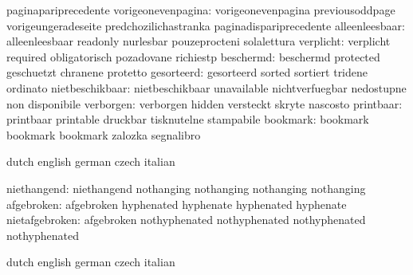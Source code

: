                            paginapariprecedente
       vorigeonevenpagina: vorigeonevenpagina        previousoddpage
                           vorigeungeradeseite       predchozilichastranka
                           paginadispariprecedente
           alleenleesbaar: alleenleesbaar            readonly
                           nurlesbar                 pouzeprocteni
                           solalettura
                verplicht: verplicht                 required
                           obligatorisch             pozadovane
                           richiestp
                beschermd: beschermd                 protected
                           geschuetzt                chranene
                           protetto
               gesorteerd: gesorteerd                sorted
                           sortiert                  tridene
                           ordinato
          nietbeschikbaar: nietbeschikbaar           unavailable
                           nichtverfuegbar           nedostupne
                           non disponibile
                verborgen: verborgen                 hidden
                           versteckt                 skryte
                           nascosto
                printbaar: printbaar                 printable
                           druckbar                  tisknutelne
                           stampabile
                 bookmark: bookmark                  bookmark
                           bookmark                  zalozka
                           segnalibro
\stopvariables


\startvariables            dutch                     english
                           german                    czech
                           italian

              niethangend: niethangend               nothanging
                           nothanging                nothanging
                           nothanging
               afgebroken: afgebroken                hyphenated 
                           hyphenate                 hyphenated
                           hyphenate 
           nietafgebroken: afgebroken                nothyphenated 
                           nothyphenated             nothyphenated 
                           nothyphenated 

\stopvariables

\startconstants            dutch                     english
                           german                    czech
                           italian

